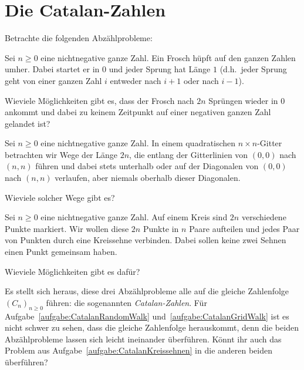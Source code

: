 \section{Die Catalan-Zahlen}
Betrachte die folgenden Abzählprobleme:

\begin{aufgabe*}\label{aufgabe:CatalanRandomWalk}
	Sei $n\geqslant 0$ eine nichtnegative ganze Zahl. Ein Frosch hüpft auf den ganzen Zahlen umher. Dabei startet er in $0$ und jeder Sprung hat Länge $1$ (d.h.\ jeder Sprung geht von einer ganzen Zahl $i$ entweder nach $i+1$ oder nach $i-1$).
	
	Wieviele Möglichkeiten gibt es, dass der Frosch nach $2n$ Sprüngen wieder in $0$ ankommt und dabei zu keinem Zeitpunkt auf einer negativen ganzen Zahl gelandet ist?
\end{aufgabe*}
\begin{aufgabe*}\label{aufgabe:CatalanGridWalk}
	Sei $n\geqslant 0$ eine nichtnegative ganze Zahl. In einem quadratischen $n\times n$-Gitter betrachten wir Wege der Länge $2n$, die entlang der Gitterlinien von $(0,0)$ nach $(n,n)$ führen und dabei stets unterhalb oder auf der Diagonalen von $(0,0)$ nach $(n,n)$ verlaufen, aber niemals oberhalb dieser Diagonalen.
	
	Wieviele solcher Wege gibt es?
\end{aufgabe*}
\begin{aufgabe*}\label{aufgabe:CatalanKreissehnen}
	Sei $n\geqslant 0$ eine nichtnegative ganze Zahl. Auf einem Kreis sind $2n$ verschiedene Punkte markiert. Wir wollen diese $2n$ Punkte in $n$ Paare aufteilen und jedes Paar von Punkten durch eine Kreissehne verbinden. Dabei sollen keine zwei Sehnen einen Punkt gemeinsam haben.
	
	Wieviele Möglichkeiten gibt es dafür?
\end{aufgabe*}

Es stellt sich heraus, diese drei Abzählprobleme alle auf die gleiche Zahlenfolge $(C_n)_{n\geqslant 0}$ führen: die sogenannten \emph{Catalan-Zahlen}. Für Aufgabe~\ref{aufgabe:CatalanRandomWalk} und~\ref{aufgabe:CatalanGridWalk} ist es nicht schwer zu sehen, dass die gleiche Zahlenfolge herauskommt, denn die beiden Abzählprobleme lassen sich leicht ineinander überführen. Könnt ihr auch das Problem aus Aufgabe~\ref{aufgabe:CatalanKreissehnen} in die anderen beiden überführen?

